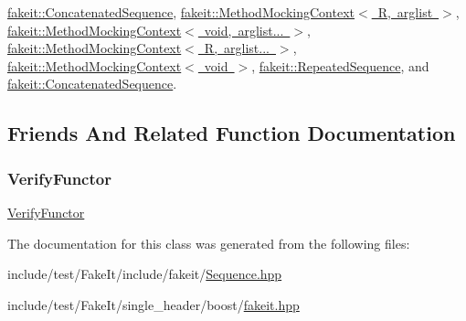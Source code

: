 \mbox{\hyperlink{classfakeit_1_1ConcatenatedSequence_aa1dba1b0274b30626ceab3a743c8105a}{fakeit\+::\+Concatenated\+Sequence}}, \mbox{\hyperlink{classfakeit_1_1MethodMockingContext_a47e66f1a704bad7681f70a3e612d08a6}{fakeit\+::\+Method\+Mocking\+Context$<$ R, arglist $>$}}, \mbox{\hyperlink{classfakeit_1_1MethodMockingContext_a47e66f1a704bad7681f70a3e612d08a6}{fakeit\+::\+Method\+Mocking\+Context$<$ void, arglist... $>$}}, \mbox{\hyperlink{classfakeit_1_1MethodMockingContext_a47e66f1a704bad7681f70a3e612d08a6}{fakeit\+::\+Method\+Mocking\+Context$<$ R, arglist... $>$}}, \mbox{\hyperlink{classfakeit_1_1MethodMockingContext_a47e66f1a704bad7681f70a3e612d08a6}{fakeit\+::\+Method\+Mocking\+Context$<$ void $>$}}, \mbox{\hyperlink{classfakeit_1_1RepeatedSequence_a64d52ac14ca69a34e8188e856e6b51a6}{fakeit\+::\+Repeated\+Sequence}}, and \mbox{\hyperlink{classfakeit_1_1ConcatenatedSequence_aa1dba1b0274b30626ceab3a743c8105a}{fakeit\+::\+Concatenated\+Sequence}}.



\subsection{Friends And Related Function Documentation}
\mbox{\label{classfakeit_1_1Sequence_a2a01b098d4a5791a5a03c1a440b1f20a}} 
\subsubsection{\texorpdfstring{VerifyFunctor}{VerifyFunctor}}
{\footnotesize\ttfamily \mbox{\hyperlink{classfakeit_1_1VerifyFunctor}{Verify\+Functor}}\hspace{0.3cm}{\ttfamily [friend]}}



The documentation for this class was generated from the following files\+:\begin{DoxyCompactItemize}
\item 
include/test/\+Fake\+It/include/fakeit/\mbox{\hyperlink{Sequence_8hpp}{Sequence.\+hpp}}\item 
include/test/\+Fake\+It/single\+\_\+header/boost/\mbox{\hyperlink{single__header_2boost_2fakeit_8hpp}{fakeit.\+hpp}}\end{DoxyCompactItemize}
